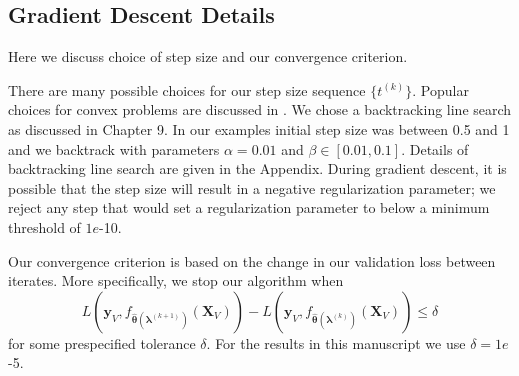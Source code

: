 \documentclass{statsoc}
\DeclareMathOperator*{\argmin}{arg\,min}
\begin{document}
%

\subsection{Gradient Descent Details}\label{sec:alg_details}
Here we discuss choice of step size and our convergence criterion.

There are many possible choices for our step size sequence $\{t^{(k)}\}$. Popular choices for convex problems are discussed in \citet{boyd2004convex}. We chose a backtracking line search as discussed in Chapter 9. In our examples initial step size was between 0.5 and 1 and we backtrack with parameters $\alpha = 0.01$ and $\beta \in [0.01, 0.1]$. Details of backtracking line search are given in the Appendix. During gradient descent, it is possible that the step size will result in a negative regularization parameter; we reject any step that would set a regularization parameter to below a minimum threshold of $1e$-10.

Our convergence criterion is based on the change in our validation loss between iterates. More specifically, we stop our algorithm when
\[
L \left( \boldsymbol{y}_V, f_{\hat{\boldsymbol \theta}(\boldsymbol{\lambda}^{(k+1)})}(\boldsymbol{X}_V)\right) -
L \left( \boldsymbol{y}_V, f_{\hat{\boldsymbol \theta}(\boldsymbol{\lambda}^{(k)})}(\boldsymbol{X}_V)\right) \leq \delta
\]
for some prespecified tolerance $\delta$. For the results in this manuscript we use $\delta = 1e$-5.

\end{document}
